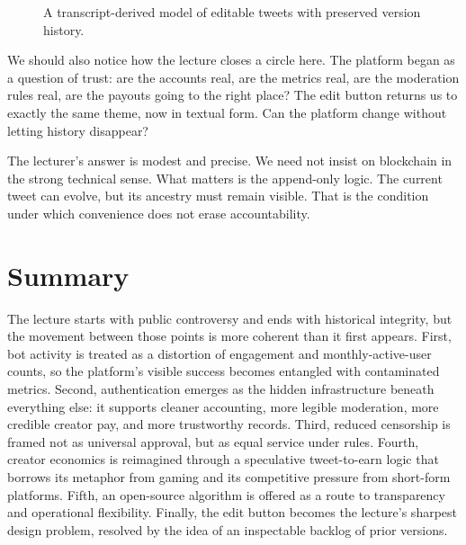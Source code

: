 \begin{figure}[h]
\centering
{}
\caption{A transcript-derived model of editable tweets with preserved version history.}
\end{figure}

We should also notice how the lecture closes a circle here. The platform began as a question of trust: are the accounts real, are the metrics real, are the moderation rules real, are the payouts going to the right place? The edit button returns us to exactly the same theme, now in textual form. Can the platform change without letting history disappear?

The lecturer's answer is modest and precise. We need not insist on blockchain in the strong technical sense. What matters is the append-only logic. The current tweet can evolve, but its ancestry must remain visible. That is the condition under which convenience does not erase accountability.

\section{Summary}

The lecture starts with public controversy and ends with historical integrity, but the movement between those points is more coherent than it first appears. First, bot activity is treated as a distortion of engagement and monthly-active-user counts, so the platform's visible success becomes entangled with contaminated metrics. Second, authentication emerges as the hidden infrastructure beneath everything else: it supports cleaner accounting, more legible moderation, more credible creator pay, and more trustworthy records. Third, reduced censorship is framed not as universal approval, but as equal service under rules. Fourth, creator economics is reimagined through a speculative tweet-to-earn logic that borrows its metaphor from gaming and its competitive pressure from short-form platforms. Fifth, an open-source algorithm is offered as a route to transparency and operational flexibility. Finally, the edit button becomes the lecture's sharpest design problem, resolved by the idea of an inspectable backlog of prior versions.

